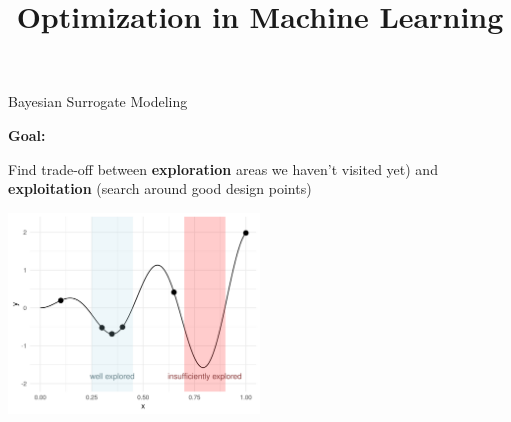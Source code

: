 \documentclass[11pt,compress,t,notes=noshow, xcolor=table]{beamer}
\title{Optimization in Machine Learning}
\date{}
\begin{document}


\begin{vbframe}{Bayesian Surrogate Modeling}

\textbf{Goal:}

Find trade-off between \textbf{exploration} areas we haven't visited yet) and \textbf{exploitation} (search around good design points)

\vspace{+.45cm}

\begin{center}
  \includegraphics[width = 0.5\textwidth]{figure_man/bayesian_loop_ee.png}
\end{center}

\framebreak 


\end{vbframe}
\end{document}
